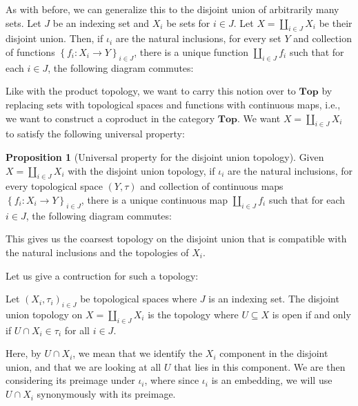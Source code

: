 \documentclass[12pt,reqno]{amsart}
\numberwithin{theorem}{section}
\theoremstyle{definition}
\theoremstyle{remark}
\numberwithin{equation}{section}
\newcommand{\set}[1]{\left \{ #1 \right \}}
\theoremstyle{definition}
\newtheorem{prop}[theorem]{Proposition}
\begin{document}
As with before, we can generalize this to the disjoint union of arbitrarily many sets. Let $J$ be an indexing set and $X_i$ be sets for $i \in J$. Let $X= \coprod_{i \in J} X_i$ be their disjoint union. Then, if $\iota_i$ are the natural inclusions, for every set $Y$ and collection of functions $\set{f_i: X_i\rightarrow Y}_{i \in J} $, there is a unique function $\coprod_{i \in J} f_i$ such that for each $i \in J$, the following diagram commutes: 
    \begin{center}
\end{center}
Like with the product topology, we want to carry this notion over to $\mathbf{Top}$ by replacing sets with topological spaces and functions with continuous maps, i.e., we want to construct a coproduct in the category $\mathbf{Top}$. We want $X=\coprod_{i \in J} X_i$ to satisfy the following universal property:
\begin{prop}[Universal property for the disjoint union topology]
    Given $X=\coprod_{i \in J} X_i$ with the disjoint union topology, if $\iota_i$ are the natural inclusions, for every topological space $(Y,\tau)$ and collection of continuous maps $\set{f_i: X_i\rightarrow Y}_{i \in J} $, there is a unique continuous map $\coprod_{i \in J} f_i$ such that for each $i \in J$, the following diagram commutes: 
    \begin{center}
\end{center}
\end{prop}
This gives us the coarsest topology on the disjoint union that is compatible with the natural inclusions and the topologies of $X_i$.

Let us give a contruction for such a topology:
\begin{definition}
    Let $(X_i,\tau_i)_{i \in J}$ be topological spaces where $J$ is an indexing set. The disjoint union topology on $X=\coprod_{i \in J} X_i$ is the topology where $U\subseteq X$ is open if and only if $U\cap X_i\in \tau_i$ for all $i \in J$.
\end{definition}
Here, by $U\cap X_i$, we mean that we identify the $X_i$ component in the disjoint union, and that we are looking at all $U$ that lies in this component. We are then considering its preimage under $\iota_i$, where since $\iota_i$ is an embedding, we will use $U\cap X_i$ synonymously with its preimage.
\end{document}
